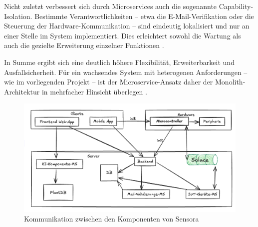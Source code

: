 Nicht zuletzt verbessert sich durch Microservices auch die sogenannte Capability-Isolation. Bestimmte Verantwortlichkeiten – etwa die E-Mail-Verifikation oder die Steuerung der Hardware-Kommunikation – sind eindeutig lokalisiert und nur an einer Stelle im System implementiert. Dies erleichtert sowohl die Wartung als auch die gezielte Erweiterung einzelner Funktionen \cite{Dragoni2017}.

In Summe ergibt sich eine deutlich höhere Flexibilität, Erweiterbarkeit und Ausfallsicherheit. Für ein wachsendes System mit heterogenen Anforderungen – wie im vorliegenden Projekt – ist der Microservice-Ansatz daher der Monolith-Architektur in mehrfacher Hinsicht überlegen \cite{Dragoni2017}.

\begin{figure}[H]
	\centering
	\includegraphics[scale=.35]{"./img/Kommunikation.png"}
	\caption{Kommunikation zwischen den Komponenten von Sensora}
	\label{fig:Kommunikation}
\end{figure}

